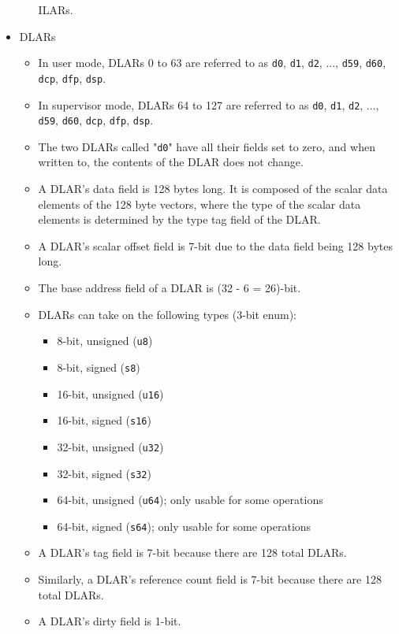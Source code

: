 \documentclass{article}
\begin{document}
\begin{itemize}
\begin{itemize}
			ILARs.
		\end{itemize}
	\item DLARs
		\begin{itemize}
		\item In user mode, DLARs 0 to 63 are referred to as \texttt{d0},
			\texttt{d1}, \texttt{d2}, ..., \texttt{d59}, \texttt{d60},
			\texttt{dcp}, \texttt{dfp}, \texttt{dsp}.
		\item In supervisor mode, DLARs 64 to 127 are referred to as
			\texttt{d0}, \texttt{d1}, \texttt{d2}, ..., \texttt{d59},
			\texttt{d60}, \texttt{dcp}, \texttt{dfp}, \texttt{dsp}.
		\item The two DLARs called "\texttt{d0}" have all their
			fields set to zero, and when written to, the contents of the
			DLAR does not change.
		\item A DLAR's data field is 128 bytes long. It is composed of the
			scalar data elements of the 128 byte vectors, where the type of
			the scalar data elements is determined by the type tag field of
			the DLAR.
		\item A DLAR's scalar offset field is 7-bit due to the data field
			being 128 bytes long.
		\item The base address field of a DLAR is (32 - 6 = 26)-bit.
		\item DLARs can take on the following types (3-bit enum):
			\begin{itemize}
			\item 8-bit, unsigned (\texttt{u8})
			\item 8-bit, signed (\texttt{s8})
			\item 16-bit, unsigned (\texttt{u16})
			\item 16-bit, signed (\texttt{s16})
			\item 32-bit, unsigned (\texttt{u32})
			\item 32-bit, signed (\texttt{s32})
			\item 64-bit, unsigned (\texttt{u64});
				only usable for some operations
			\item 64-bit, signed (\texttt{s64});
				only usable for some operations
			\end{itemize}
		\item A DLAR's tag field is 7-bit because there are 128 total
			DLARs.
		\item Similarly, a DLAR's reference count field is 7-bit because
			there are 128 total DLARs.
		\item A DLAR's dirty field is 1-bit.

\end{itemize}
\end{itemize}
\end{document}
